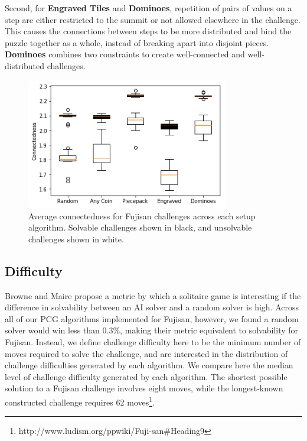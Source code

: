 \documentclass[10pt,journal,compsoc]{IEEEtran}
\begin{document}
Second, for {\bf Engraved Tiles} and {\bf Dominoes}, repetition of pairs of values on a step are either restricted to the summit or not allowed elsewhere in the challenge. This causes the connections between steps to be more distributed and bind the puzzle together as a whole, instead of breaking apart into disjoint pieces. {\bf Dominoes} combines two constraints to create well-connected and well-distributed challenges.

\begin{figure}[t]
\includegraphics[width=8.8cm]{connectedness.png}
\caption{Average connectedness for Fujisan challenges across each setup algorithm. 
Solvable challenges shown in black, and unsolvable challenges shown in white.}
\label{fig:connected}
\end{figure}


\subsection{Difficulty}

Browne and Maire \cite{MCPUZZLE} propose a metric by which a solitaire game is interesting if the difference in solvability between an AI solver and a random solver is high. Across all of our PCG algorithms implemented for Fujisan, however, we found a random solver would win less than 0.3\%, making their metric equivalent to solvability for Fujisan. Instead, we define challenge difficulty here to be the minimum number of moves required to solve the challenge, and are interested in the distribution of challenge difficulties generated by each algorithm. We compare here the median level of challenge difficulty generated by each algorithm. The shortest possible solution to a Fujisan challenge involves eight moves, while 
the longest-known constructed challenge requires 62 moves\footnote{http://www.ludism.org/ppwiki/Fuji-san\#Heading9}.
\end{document}
